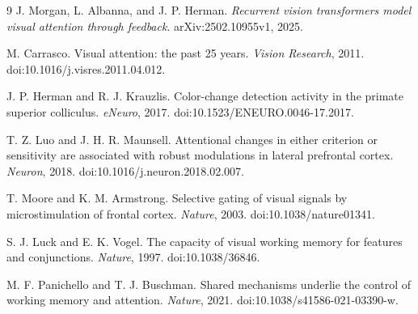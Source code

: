 \documentclass[11pt,a4paper]{article}
\begin{document}
\clearpage
\begin{thebibliography}{9}
 J. Morgan, L. Albanna, and J. P. Herman. \emph{Recurrent vision transformers model visual attention through feedback}. arXiv:2502.10955v1, 2025.

 M. Carrasco. Visual attention: the past 25 years. \emph{Vision Research}, 2011. doi:10.1016/j.visres.2011.04.012.

 J. P. Herman and R. J. Krauzlis. Color-change detection activity in the primate superior colliculus. \emph{eNeuro}, 2017. doi:10.1523/ENEURO.0046-17.2017.

 T. Z. Luo and J. H. R. Maunsell. Attentional changes in either criterion or sensitivity are associated with robust modulations in lateral prefrontal cortex. \emph{Neuron}, 2018. doi:10.1016/j.neuron.2018.02.007.

 T. Moore and K. M. Armstrong. Selective gating of visual signals by microstimulation of frontal cortex. \emph{Nature}, 2003. doi:10.1038/nature01341.

 S. J. Luck and E. K. Vogel. The capacity of visual working memory for features and conjunctions. \emph{Nature}, 1997. doi:10.1038/36846.

 M. F. Panichello and T. J. Buschman. Shared mechanisms underlie the control of working memory and attention. \emph{Nature}, 2021. doi:10.1038/s41586-021-03390-w.
\end{thebibliography}
\end{document}

